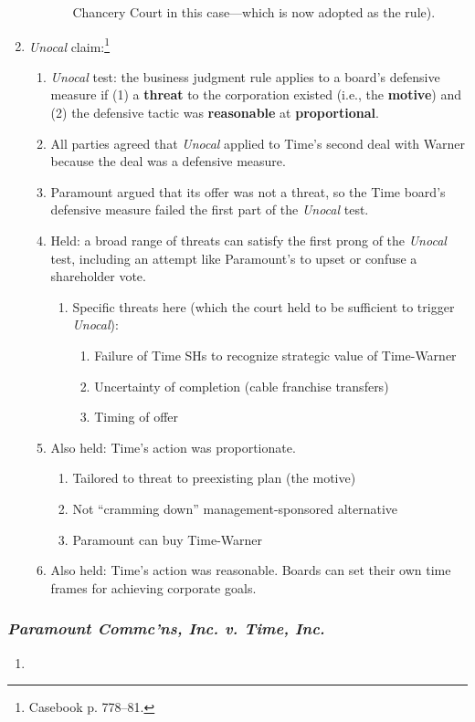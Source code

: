 \begin{enumerate}
\begin{enumerate}
\begin{enumerate}
            Chancery Court in this case---which is now adopted as the rule).
        \end{enumerate}
    \end{enumerate}
    \item \emph{Unocal} claim:\footnote{Casebook p. 778--81.}
    \begin{enumerate}
        \item \emph{Unocal} test: the business judgment rule applies to a 
        board's defensive measure if (1) a \textbf{threat} to the corporation 
        existed (i.e., the \textbf{motive}) and (2) the defensive tactic was 
        \textbf{reasonable} at \textbf{proportional}.
        \item All parties agreed that \emph{Unocal} applied to Time's second 
        deal with Warner because the deal was a defensive measure.
        \item Paramount argued that its offer was not a threat, so the Time 
        board's defensive measure failed the first part of the \emph{Unocal} 
        test.
        \item Held: a broad range of threats can satisfy the first prong of the 
        \emph{Unocal} test, including an attempt like Paramount's to upset or 
        confuse a shareholder vote.
        \begin{enumerate}
            \item Specific threats here (which the court held to be sufficient 
            to trigger \emph{Unocal}):
            \begin{enumerate}
                \item Failure of Time SHs to recognize strategic value of 
                Time-Warner
                \item Uncertainty of completion (cable franchise transfers)
                \item Timing of offer
            \end{enumerate}
        \end{enumerate}
        \item Also held: Time's action was proportionate.
        \begin{enumerate}
            \item Tailored to threat to preexisting plan (the motive)
            \item Not ``cramming down'' management-sponsored alternative
            \item Paramount can buy Time-Warner
        \end{enumerate}
        \item Also held: Time's action was reasonable. Boards can set their own 
        time frames for achieving corporate goals.
    \end{enumerate}
\end{enumerate}

\subsubsection{\emph{Paramount Commc'ns, Inc. v. Time, Inc.}}

\begin{enumerate}
    \item %
\end{enumerate}
